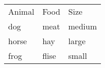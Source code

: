 \documentclass{article}
\begin{document}
\newpage



\begin{tabular}{*{3}{l}} %
    Animal  & Food  & Size      \\
    dog     & meat  & medium    \\
    horse   & hay   & large     \\
    frog    & flise & small     \\
\end{tabular}
\end{document}
